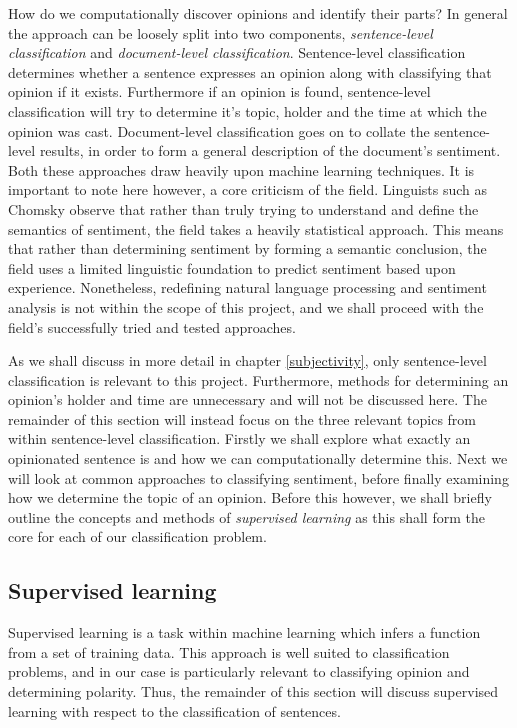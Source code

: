 How do we computationally discover opinions and identify their parts? In general the approach can be loosely split into two components, \emph{sentence-level classification} and \emph{document-level classification}. Sentence-level classification determines whether a sentence expresses an opinion along with classifying that opinion if it exists. Furthermore if an opinion is found, sentence-level classification will try to determine it's topic, holder and the time at which the opinion was cast. Document-level classification goes on to collate the sentence-level results, in order to form a general description of the document's sentiment. Both these approaches draw heavily upon machine learning techniques. It is important to note here however, a core criticism of the field. Linguists such as Chomsky \cite{norvig} observe that rather than truly trying to understand and define the semantics of sentiment, the field takes a heavily statistical approach. This means that rather than determining sentiment by forming a semantic conclusion, the field uses a limited linguistic foundation to predict sentiment based upon experience. Nonetheless, redefining natural language processing and sentiment analysis is not within the scope of this project, and we shall proceed with the field's successfully tried and tested approaches.

As we shall discuss in more detail in chapter \ref{subjectivity}, only sentence-level classification is relevant to this project. Furthermore, methods for determining an opinion's holder and time are unnecessary and will not be discussed here. The remainder of this section will instead focus on the three relevant topics from within sentence-level classification. Firstly we shall explore what exactly an opinionated sentence is and how we can computationally determine this. Next we will look at common approaches to classifying sentiment, before finally examining how we determine the topic of an opinion. Before this however, we shall briefly outline the concepts and methods of \emph{supervised learning} as this shall form the core for each of our classification problem.

\subsection{Supervised learning}
\label{background:supervised_learning}

Supervised learning is a task within machine learning which infers a function from a set of training data. This approach is well suited to classification problems, and in our case is particularly relevant to classifying opinion and determining polarity. Thus, the remainder of this section will discuss supervised learning with respect to the classification of sentences. 

